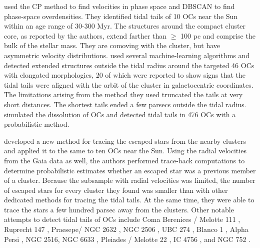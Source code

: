 \documentclass{aa}
\begin{document}
\citet{2021A&A...645A..84Meingast} used the CP method to find velocities in phase space and DBSCAN to find phase-space overdensities. They identified tidal tails of 10 OCs near the Sun within an age range of 30-300 Myr. The structures around the compact cluster core, as reported by the authors, extend farther than $\geq$ 100 pc and comprise the bulk of the stellar mass. They are comoving with the cluster, but have asymmetric velocity distributions. \citet{10.1093/mnras/stac2906} used several machine-learning algorithms and detected extended structures outside the tidal radius around the targeted 46 OCs with elongated morphologies, 20 of which were reported to show signs that the tidal tails were aligned with the orbit of the cluster in galactocentric coordinates. The limitations arising from the method they used truncated the tails at very short distances. The shortest tails ended a few parsecs outside the tidal radius. \citet{2024arXiv240618767Kos} simulated the dissolution of OCs and detected tidal tails in 476 OCs with a probabilistic method. 

\citet{2023A&A...679A.105Vaher} developed a new method for tracing the escaped stars from the nearby clusters and applied it to the same to ten OCs near the Sun. Using the radial velocities from the Gaia data as well, the authors performed trace-back computations to determine probabilistic estimates whether an escaped star was a previous member of a cluster. Because the subsample with radial velocities was limited, the number of escaped stars for every cluster they found was smaller than with other dedicated methods for tracing the tidal tails. At the same time, they were able to trace the stars a few hundred parsec away from the clusters. Other notable attempts to detect tidal tails of OCs include Coma Berenices / Melotte 111 \citep{2019A&A...624L..11Furnkranz, 2019ApJ...877...12Tang, 2021ApJ...912..162Pang}, Ruprecht 147 \citep{2019AJ....157..115Yeh}, Praesepe/ NGC 2632 \citep{2019A&A...627A...4Roser_Praesepe}, NGC 2506 \citep{2020ApJ...894...48Gao}, UBC 274 
\citep{2020A&A...635A..45Castro-Ginard}, Blanco 1 \citep{2020ApJ...889...99Zhang,2021ApJ...912..162Pang,2023A&A...679A.105Vaher}, Alpha Persi \citep{2020AJ....160..142Nikiforova, 2021A&A...645A..84Meingast}, NGC 2516, NGC 6633 \citep{2021ApJ...912..162Pang}, Pleiades / Melotte 22 \citep{2021RNAAS...5..173Li,2021A&A...645A..84Meingast,2023A&A...679A.105Vaher} , IC 4756 \citep{2021AJ....162..171Ye}, and NGC 752 \citep{2021MNRAS.505.1607Bhattacharya, 2022MNRAS.514.3579Boffin}. 
\end{document}
